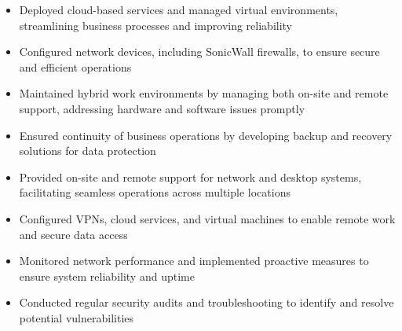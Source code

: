 \par\smallskip
\noindent
\begin{minipage}{20cm}
  \begin{minipage}{9.75cm}
    \begin{itemize}
      \item Deployed cloud-based services and managed virtual environments, streamlining business processes and improving reliability
      \item Configured network devices, including SonicWall firewalls, to ensure secure and efficient operations
    \end{itemize}
  \end{minipage}
  \hfill
  \begin{minipage}{9.75cm}
    \begin{itemize}
      \item Maintained hybrid work environments by managing both on-site and remote support, addressing hardware and software issues promptly
      \item Ensured continuity of business operations by developing backup and recovery solutions for data protection
    \end{itemize}
  \end{minipage}
\end{minipage}
\par\smallskip
\divider

\par\smallskip
\noindent
\begin{minipage}{20cm}
  \begin{minipage}{9.75cm}
    \begin{itemize}
      \item Provided on-site and remote support for network and desktop systems, facilitating seamless operations across multiple locations
      \item Configured VPNs, cloud services, and virtual machines to enable remote work and secure data access
    \end{itemize}
  \end{minipage}
  \hfill
  \begin{minipage}{9.75cm}
    \begin{itemize}
      \item Monitored network performance and implemented proactive measures to ensure system reliability and uptime
      \item Conducted regular security audits and troubleshooting to identify and resolve potential vulnerabilities
    \end{itemize}
  \end{minipage}
\end{minipage}

